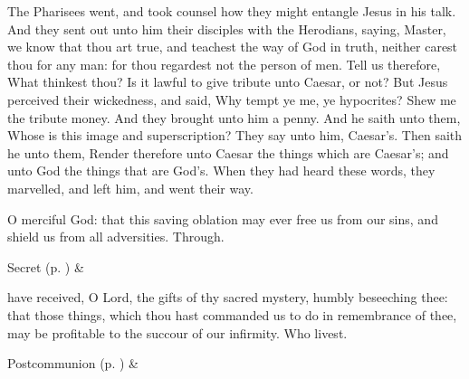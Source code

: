 
 The Pharisees went, and took counsel how they might entangle Jesus in his talk. And they sent out unto him their disciples with the Herodians, saying, Master, we know that thou art true, and teachest the way of God in truth, neither carest thou for any man: for thou regardest not the person of men. Tell us therefore, What thinkest thou? Is it lawful to give tribute unto Caesar, or not? But Jesus perceived their wickedness, and said, Why tempt ye me, ye hypocrites? Shew me the tribute money. And they brought unto him a penny. And he saith unto them, Whose is this image and superscription? They say unto him, Caesar's. Then saith he unto them, Render therefore unto Caesar the things which are Caesar's; and unto God the things that are God's. When they had heard these words, they marvelled, and left him, and went their way.


\secret
{} O merciful God: that this saving oblation may ever free us from our sins, and shield us from all adversities. Through.


\begin{rubric}
     Secret  (p. \pageref{SPSaints}) \&  
\end{rubric}


\postcommunion
{} have received, O Lord, the gifts of thy sacred mystery, humbly beseeching thee: that those things, which thou hast commanded us to do in remembrance of thee, may be profitable to the succour of our infirmity. Who livest.
\begin{rubric}
     Postcommunion  (p. \pageref{SPSaints}) \&  
\end{rubric}


